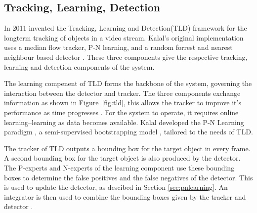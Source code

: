 \subsection{Tracking, Learning, Detection}\label{sec:tld}
  In 2011 \citeauthor{Kalal2011} invented the Tracking, Learning and Detection(TLD) framework for the longterm tracking of objects in a video stream.
  Kalal's original implementation uses a median flow tracker, P-N learning, and a random forrest and nearest neighbour based detector \cite{KalalPHD}.
  These three components give the respective tracking, learning and detection components of the system.

  The learning compenent of TLD forms the backbone of the system, governing the interaction between the detector and tracker.
  The three components exchange information as shown in Figure~\ref{fig:tld}, this allows the tracker to improve it's performance as time progresses \cite{Kalal2011}.
  For the system to operate, it requires online learning--learning as data becomes available. 
  Kalal developed the P-N Learning paradigm \cite{PNLearning}, a semi-supervised bootstrapping model \cite{murphy2012}, tailored to the needs of TLD.

  The tracker of TLD outputs a bounding box for the target object in every frame.
  A second bounding box for the target object is also produced by the detector.
  The P-experts and N-experts of the learning component use these bounding boxes to determine the false positives and the false negatives of the detector.
  This is used to update the detector, as descibed in Section \ref{sec:pnlearning}.
  An integrator is then used to combine the bounding boxes given by the tracker and detector \cite{Kalal2011}.

